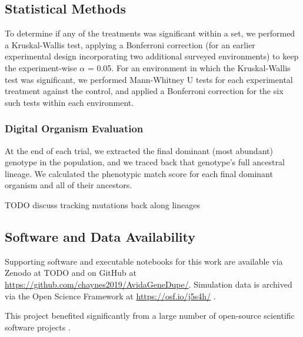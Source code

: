 \subsection{Statistical Methods}

To determine if any of the treatments was significant within a set, we performed a Kruskal-Wallis test, applying a Bonferroni correction (for an earlier experimental design incorporating two additional surveyed environments) to keep the experiment-wise $\alpha$ = 0.05.
For an environment in which the Kruskal-Wallis test was significant, we performed Mann-Whitney U tests for each experimental treatment against the control, and applied a Bonferroni correction for the six such tests within each environment.

\subsubsection{Digital Organism Evaluation}
At the end of each trial, we extracted the final dominant (most abundant) genotype in the population, and we traced back that genotype's full ancestral lineage.
We calculated the phenotypic match score for each final dominant organism and all of their ancestors.

TODO discuss tracking mutations back along lineages

\subsection{Software and Data Availability} \label{sec:materials}

Supporting software and executable notebooks for this work are available via Zenodo at TODO \citep{TODO} and on GitHub at \url{https://github.com/chaynes2019/AvidaGeneDupe/}.
Simulation data is archived via the Open Science Framework at \url{https://osf.io/j5s4h/} \citep{foster2017open}.

This project benefited significantly from a large number of open-source scientific software projects \citep{2020SciPy-NMeth,harris2020array,reback2020pandas,mckinney-proc-scipy-2010,waskom2021seaborn,hunter2007matplotlib,moreno2023teeplot,r_core_team_r:_2015}.
